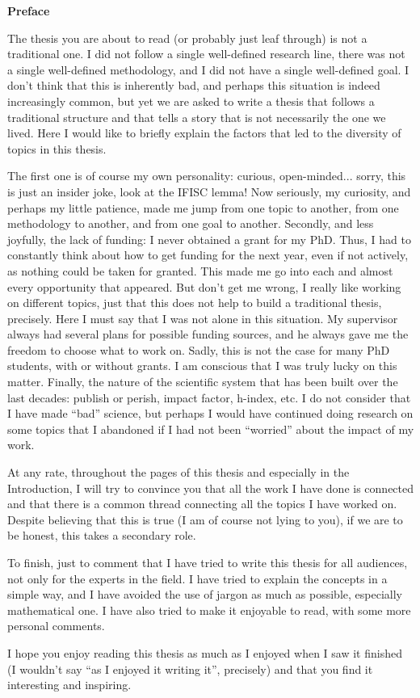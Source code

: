 \pagebreak
\thispagestyle{empty}

\begin{center}
    \textbf{\Large Preface}
\end{center}

The thesis you are about to read (or probably just leaf through) is not a
traditional one. I did not follow a single well-defined research line, there
was not a single well-defined methodology, and I did not have a single
well-defined goal. I don't think that this is inherently bad, and perhaps this
situation is indeed increasingly common, but yet we are asked to write a thesis
that follows a traditional structure and that tells a story that is not
necessarily the one we lived. Here I would like to briefly explain the factors
that led to the diversity of topics in this thesis.

The first one is of course my own personality: curious, open-minded... sorry,
this is just an insider joke, look at the IFISC lemma! Now seriously, my
curiosity, and perhaps my little patience, made me jump from one topic to
another, from one methodology to another, and from one goal to another.
Secondly, and less joyfully, the lack of funding: I never obtained a grant for
my PhD. Thus, I had to constantly think about how to get funding for
the next year, even if not actively, as nothing could be taken for granted.
This made me go into each and almost every opportunity that appeared. But don't
get me wrong, I really like working on different topics, just that this does
not help to build a traditional thesis, precisely. Here I must say that I was
not alone in this situation. My supervisor always had several plans for
possible funding sources, and he always gave me the freedom to choose what to
work on. Sadly, this is not the case for many PhD students, with or without
grants. I am conscious that I was truly lucky on this matter. Finally, the
nature of the scientific system that has been built over the last decades:
publish or perish, impact factor, h-index, etc. I do not consider that I
have made ``bad'' science, but perhaps I would have continued doing research on
some topics that I abandoned if I had not been ``worried'' about the impact of
my work.

At any rate, throughout the pages of this thesis and especially in the
Introduction, I will try to convince you that all the work I have done is
connected and that there is a common thread connecting all the topics I have
worked on. Despite believing that this is true (I am of course not lying to
you), if we are to be honest, this takes a secondary role.

To finish, just to comment that I have tried to write this thesis for all
audiences, not only for the experts in the field. I have tried to explain the
concepts in a simple way, and I have avoided the use of jargon as much as
possible, especially mathematical one. I have also tried to make it enjoyable
to read, with some more personal comments.

I hope you enjoy reading this thesis as much as I enjoyed when I saw it
finished (I wouldn't say ``as I enjoyed it writing it'', precisely) and that
you find it interesting and inspiring.

\vfill